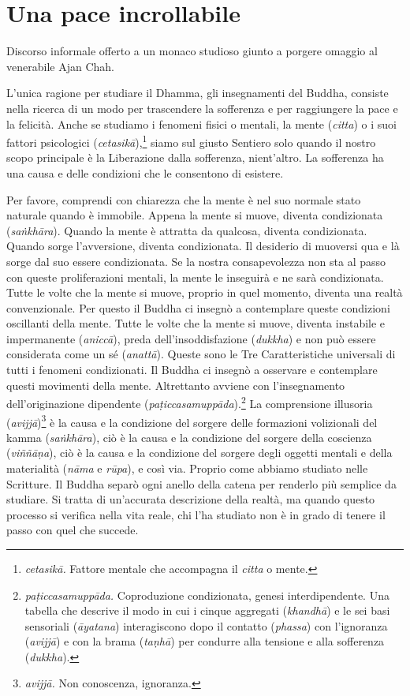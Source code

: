 \chapter{Una pace incrollabile}

\begin{openingQuote}
  \centering

  Discorso informale offerto a un monaco studioso giunto a porgere omaggio al
  venerabile Ajan Chah.
\end{openingQuote}

L'unica ragione per studiare il Dhamma, gli insegnamenti del Buddha,
consiste nella ricerca di un modo per trascendere la sofferenza e per
raggiungere la pace e la felicità. Anche se studiamo i fenomeni fisici o
mentali, la mente (\emph{citta}) o i suoi fattori psicologici
(\emph{cetasikā}),\footnote{\emph{cetasikā.} Fattore mentale che
  accompagna il \emph{citta} o mente.} siamo sul giusto Sentiero solo
quando il nostro scopo principale è la Liberazione dalla sofferenza,
nient'altro. La sofferenza ha una causa e delle condizioni che le
consentono di esistere.

Per favore, comprendi con chiarezza che la mente è nel suo normale stato
naturale quando è immobile. Appena la mente si muove, diventa
condizionata (\emph{saṅkhāra}). Quando la mente è attratta da qualcosa,
diventa condizionata. Quando sorge l'avversione, diventa condizionata.
Il desiderio di muoversi qua e là sorge dal suo essere condizionata. Se
la nostra consapevolezza non sta al passo con queste proliferazioni
mentali, la mente le inseguirà e ne sarà condizionata. Tutte le volte
che la mente si muove, proprio in quel momento, diventa una realtà
convenzionale. Per questo il Buddha ci insegnò a contemplare queste
condizioni oscillanti della mente. Tutte le volte che la mente si muove,
diventa instabile e impermanente (\emph{aniccā}), preda
dell'insoddisfazione (\emph{dukkha}) e non può essere considerata come
un sé (\emph{anattā}). Queste sono le Tre Caratteristiche universali di
tutti i fenomeni condizionati. Il Buddha ci insegnò a osservare e
contemplare questi movimenti della mente. Altrettanto avviene con
l'insegnamento dell'originazione dipendente
(\emph{paṭiccasamuppāda}).\footnote{\emph{paṭiccasamuppāda.}
  Coproduzione condizionata, genesi interdipendente. Una tabella che
  descrive il modo in cui i cinque aggregati (\emph{khandhā}) e le sei
  basi sensoriali (\emph{āyatana}) interagiscono dopo il contatto
  (\emph{phassa}) con l'ignoranza (\emph{avijjā}) e con la brama
  (\emph{taṇhā}) per condurre alla tensione e alla sofferenza
  (\emph{dukkha}).} La comprensione illusoria (\emph{avijjā})\footnote{\emph{avijjā.}
  Non conoscenza, ignoranza.} è la causa e la condizione del sorgere
delle formazioni volizionali del kamma (\emph{saṅkhāra}), ciò è
la causa e la condizione del sorgere della coscienza (\emph{viññāṇa}),
ciò è la causa e la condizione del sorgere degli oggetti mentali e della
materialità (\emph{nāma} e \emph{rūpa}), e così via. Proprio come
abbiamo studiato nelle Scritture. Il Buddha separò ogni anello della
catena per renderlo più semplice da studiare. Si tratta di un'accurata
descrizione della realtà, ma quando questo processo si verifica nella
vita reale, chi l'ha studiato non è in grado di tenere il passo con quel
che succede.

